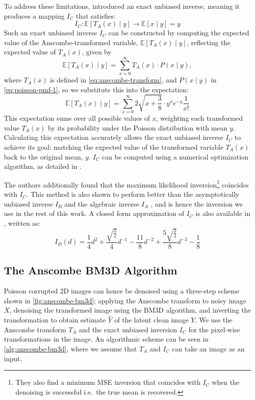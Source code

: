 To address these limitations, \citeauthor{makitaloOptimalInversionAnscombe2011} introduced an exact unbiased inverse, meaning it produces a mapping $I_C$ that satisfies:
\begin{equation}
    I_C: \mathbb{E}[T_A(x) \mid y] \to \mathbb{E}[x \mid y] = y
\end{equation}
Such an exact unbiased inverse $I_C$ can be constructed by computing the expected value of the Anscombe-transformed variable, $\mathbb{E}[T_A(x) \mid y]$, reflecting the expected value of $T_A(x) $, given by
\begin{equation}   
    \mathbb{E}[T_A(x) \mid y] = \sum_{x=0}^{\infty} T_A(x) \cdot P(x \mid y),
\end{equation}
where $T_A(x)$ is defined in \cref{eq:anscombe-transform}, and $P(x \mid y)$ in \cref{eq:poisson-pmf-1}, so we substitute this into the expectation:
\begin{equation*}
    \mathbb{E}[T_A(x) \mid y] = \sum_{x=0}^{\infty} 2 \sqrt{x + \frac{3}{8}} \cdot y^x e^{-y} \frac{1}{x!}
\end{equation*}
This expectation sums over all possible values of $x$, weighting each transformed value $T_A(x)$ by its probability under the Poisson distribution with mean $y$. Calculating this expectation accurately allows the exact unbiased inverse  $I_C$  to achieve its goal: matching the expected value of the transformed variable $T_A(x)$ back to the original mean, $y$. $I_C$ can be computed using a numerical optimization algorithm, as detailed in \cite{makitaloOptimalInversionAnscombe2011}. 

The authors additionally found that the maximum likelihood inversion\footnote{They also find a minimum \gls{MSE} inversion that coincides with $I_C$ when the denoising is successful i.e.\ the true mean is recovered.} coincides with $I_C$. This method is also shown to perform better than the asymptotically unbiased inverse $I_B$ and the algebraic inverse $I_A$ \cite{makitaloOptimalInversionAnscombe2011}, and is hence the inversion we use in the rest of this work.
A closed form approximation of $I_C$ is also available in \cite{makitaloClosedFormApproximationExact2011}, written as:
\begin{equation}
    I_D(d) = \frac{1}{4} d^2 + \frac{\sqrt{\frac{3}{2}}}{4} d^{-1} - \frac{11}{8} d^{-2} + \frac{5 \sqrt{\frac{3}{2}}}{8} d^{-3} - \frac{1}{8}
\end{equation}

\subsection{The Anscombe BM3D Algorithm}
Poisson corrupted 2D images can hence be denoised using a three-step scheme shown in \cref{fig:anscombe-bm3d}; applying the Anscombe transform to noisy image $X$, denoising the transformed image using the \gls{BM3D} algorithm, and inverting the transformation to obtain estimate $\hat{Y}$ of the latent clean image $Y$. We use the Anscombe transform $T_A$ and the exact unbiased inversion $I_C$ for the pixel-wise transformations in the image. An algorithmic scheme can be seen in \cref{alg:anscombe-bm3d}, where we assume that $T_A$ and $I_C$ can take an image as an input.

